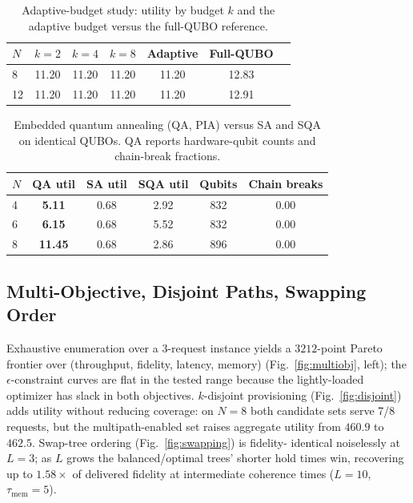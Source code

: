 \documentclass[twocolumn]{article}
\begin{document}
\begin{table}[tbp]
  \centering
  \caption{Adaptive-budget study: utility by budget $k$ and the
    adaptive budget versus the full-QUBO reference.}
  \label{tab:budget}
  \small\setlength{\tabcolsep}{4pt}
  \begin{tabular}{lcccccc}
    \toprule
    $N$ & $k{=}2$ & $k{=}4$ & $k{=}8$ & Adaptive & Full-QUBO \\
    \midrule
    8  & 11.20 & 11.20 & 11.20 & 11.20 & 12.83 \\
    12 & 11.20 & 11.20 & 11.20 & 11.20 & 12.91 \\
    \bottomrule
  \end{tabular}
\end{table}

\begin{table}[tbp]
  \centering
  \caption{Embedded quantum annealing (QA, PIA) versus SA and SQA on
    identical QUBOs.  QA reports hardware-qubit counts and chain-break
    fractions.}
  \label{tab:qa}
  \small\setlength{\tabcolsep}{4pt}
  \begin{tabular}{lccccc}
    \toprule
    $N$ & QA util & SA util & SQA util & Qubits & Chain breaks \\
    \midrule
    4 & \textbf{5.11} & 0.68 & 2.92 & 832 & 0.00 \\
    6 & \textbf{6.15} & 0.68 & 5.52 & 832 & 0.00 \\
    8 & \textbf{11.45} & 0.68 & 2.86 & 896 & 0.00 \\
    \bottomrule
  \end{tabular}
\end{table}

\subsection{Multi-Objective, Disjoint Paths, Swapping Order}
\label{sec:results-analysis}

Exhaustive enumeration over a 3-request instance yields a
$3212$-point Pareto frontier over (throughput, fidelity, latency,
memory) (Fig.~\ref{fig:multiobj}, left); the $\epsilon$-constraint
curves are flat in the tested range because the lightly-loaded
optimizer has slack in both objectives.  $k$-disjoint provisioning
(Fig.~\ref{fig:disjoint}) adds utility without reducing coverage:
on $N{=}8$ both candidate sets serve 7/8 requests, but the
multipath-enabled set raises aggregate utility from $460.9$ to
$462.5$.  Swap-tree ordering (Fig.~\ref{fig:swapping}) is fidelity-
identical noiselessly at $L{=}3$; as $L$ grows the balanced/optimal
trees' shorter hold times win, recovering up to $1.58\times$ of
delivered fidelity at intermediate coherence times
($L{=}10$, $\tau_{\text{mem}}=5$).
\end{document}

